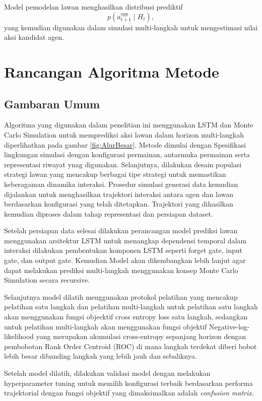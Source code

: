 Model pemodelan lawan menghasilkan distribusi prediktif
\[
p(a_{t+1}^{opp} \mid H_t),
\]
yang kemudian digunakan dalam simulasi multi-langkah
untuk mengestimasi nilai aksi kandidat agen.

\section{Rancangan Algoritma Metode}
\subsection{Gambaran Umum}
Algoritma yang digunakan dalam penelitian ini menggunakan LSTM dan Monte Carlo Simulation untuk memprediksi aksi lawan dalam horizon multi-langkah diperlihatkan pada gambar \ref{fig:AlurBesar}.
Metode dimulai dengan Spesifikasi lingkungan simulasi dengan konfigurasi permainan, antarmuka permainan serta representasi riwayat ynag digunakan. Selanjutnya, dilakukan desain populasi strategi lawan yang mencakup berbagai tipe strategi untuk memastikan keberagaman dinamika interaksi. Prosedur simulasi generasi data kemudian dijalankan untuk menghasilkan trajektori interaksi antara agen dan lawan berdasarkan konfigurasi yang telah ditetapkan. Trajektori yang dihasilkan kemudian diproses dalam tahap representasi dan persiapan dataset. 

Setelah persiapan data selesai dilakukan perancangan model prediksi lawan menggunakan arsitektur LSTM untuk menangkap dependensi temporal dalam interaksi dilakukan pembentukan komponen LSTM seperti forget gate, input gate, dan output gate. Kemudian Model akan dikembangkan lebih lanjut agar dapat melakukan prediksi multi-langkah menggunakan konsep Monte Carlo Simulation secara recursive.

Selanjutnya model dilatih menggunakan protokol pelatihan yang mencakup pelatihan satu langkah dan pelatihan multi-langkah untuk pelatihan satu langkah akan menggunakan fungsi objecktif cross entropy loss satu langkah, sedangkan untuk pelatihan multi-langkah akan menggunakan fungsi objektif Negative-log-likelihood yang merupakan akumulasi cross-entropy sepanjang horizon dengan pembobotan Rank Order Centroid (ROC) di mana langkah terdekat diberi bobot lebih besar dibanding langkah yang lebih jauh dan sebaliknya. 

Setelah model dilatih, dilakukan validasi model dengan melakukan hyperparameter tuning untuk memilih konfigurasi terbaik berdasarkan performa trajektorial dengan fungsi objektif yang dimaksimalkan adalah \textit{confusion matrix}.  

